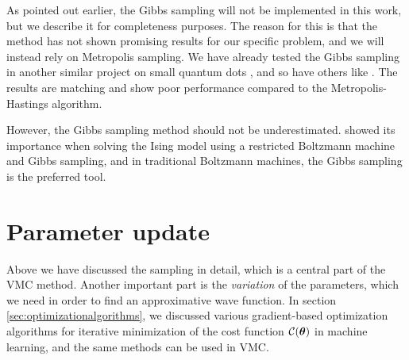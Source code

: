 As pointed out earlier, the Gibbs sampling will not be implemented in this work, but we describe it for completeness purposes. The reason for this is that the method has not shown promising results for our specific problem, and we will instead rely on Metropolis sampling. We have already tested the Gibbs sampling in another similar project on small quantum dots \cite{nordhagen_computational_2018}, and so have others like \citet{flugsrud_vilde_moe_solving_nodate}. The results are matching and show poor performance compared to the Metropolis-Hastings algorithm.

However, the Gibbs sampling method should not be underestimated. \citet{carleo_solving_2017} showed its importance when solving the Ising model using a restricted Boltzmann machine and Gibbs sampling, and in traditional Boltzmann machines, the Gibbs sampling is the preferred tool.

\section{Parameter update} \label{sec:parameterupdate}
Above we have discussed the sampling in detail, which is a central part of the VMC method. Another important part is the \textit{variation} of the parameters, which we need in order to find an approximative wave function. In section \ref{sec:optimizationalgorithms}, we discussed various gradient-based optimization algorithms for iterative minimization of the cost function $\mathcal{C}(\boldsymbol{{\theta}})$ in machine learning, and the same methods can be used in VMC.


